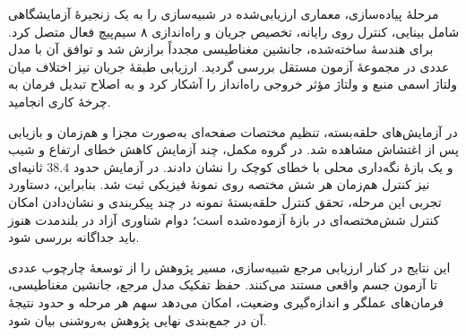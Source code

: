 مرحلهٔ پیاده‌سازی، معماری ارزیابی‌شده در شبیه‌سازی را به یک زنجیرهٔ آزمایشگاهی شامل بینایی، کنترل روی رایانه، تخصیص جریان و راه‌اندازی ۸ سیم‌پیچ فعال متصل کرد. برای هندسهٔ ساخته‌شده، جانشین مغناطیسی مجدداً برازش شد و توافق آن با مدل عددی در مجموعهٔ آزمون مستقل بررسی گردید. ارزیابی طبقهٔ جریان نیز اختلاف میان ولتاژ اسمی منبع و ولتاژ مؤثر خروجی راه‌انداز را آشکار کرد و به اصلاح تبدیل فرمان به چرخهٔ کاری انجامید.

در آزمایش‌های حلقه‌بسته، تنظیم مختصات صفحه‌ای به‌صورت مجزا و هم‌زمان و بازیابی پس از اغتشاش مشاهده شد. در گروه مکمل، چند آزمایش کاهش خطای ارتفاع و شیب و یک بازهٔ نگه‌داری محلی با خطای کوچک را نشان دادند. در آزمایش حدود $38.4$ ثانیه‌ای نیز کنترل هم‌زمان هر شش مختصه روی نمونهٔ فیزیکی ثبت شد. بنابراین، دستاورد تجربی این مرحله، تحقق کنترل حلقه‌بستهٔ نمونه در چند پیکربندی و نشان‌دادن امکان کنترل شش‌مختصه‌ای در بازهٔ آزموده‌شده است؛ دوام شناوری آزاد در بلندمدت هنوز باید جداگانه بررسی شود.

این نتایج در کنار ارزیابی مرجع شبیه‌سازی، مسیر پژوهش را از توسعهٔ چارچوب عددی تا آزمون جسم واقعی مستند می‌کنند. حفظ تفکیک مدل مرجع، جانشین مغناطیسی، فرمان‌های عملگر و اندازه‌گیری وضعیت، امکان می‌دهد سهم هر مرحله و حدود نتیجهٔ آن در جمع‌بندی نهایی پژوهش به‌روشنی بیان شود.







